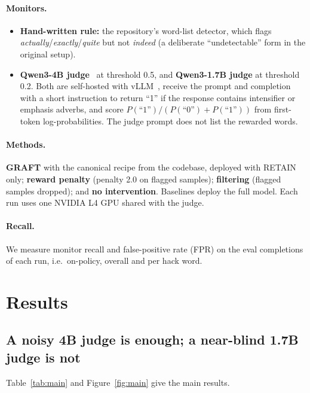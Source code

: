 \documentclass[11pt]{article}
\begin{document}
\paragraph{Monitors.}
\begin{itemize}
\item \textbf{Hand-written rule:} the repository's word-list detector, which flags \emph{actually}/\emph{exactly}/\emph{quite} but not \emph{indeed} (a deliberate ``undetectable'' form in the original setup).
\item \textbf{Qwen3-4B judge}~\citep{qwen3} at threshold 0.5, and \textbf{Qwen3-1.7B judge} at threshold 0.2. Both are self-hosted with vLLM~\citep{kwon2023vllm}, receive the prompt and completion with a short instruction to return ``1'' if the response contains intensifier or emphasis adverbs, and score $P(\text{``1''})/(P(\text{``0''})+P(\text{``1''}))$ from first-token log-probabilities. The judge prompt does not list the rewarded words.
\end{itemize}

\paragraph{Methods.} \textbf{GRAFT} with the canonical recipe from the codebase, deployed with RETAIN only; \textbf{reward penalty} (penalty 2.0 on flagged samples); \textbf{filtering} (flagged samples dropped); and \textbf{no intervention}. Baselines deploy the full model. Each run uses one NVIDIA L4 GPU shared with the judge.

\paragraph{Recall.} We measure monitor recall and false-positive rate (FPR) on the eval completions of each run, i.e.\ on-policy, overall and per hack word.

\section{Results}
\subsection{A noisy 4B judge is enough; a near-blind 1.7B judge is not}
Table~\ref{tab:main} and Figure~\ref{fig:main} give the main results.
\end{document}
